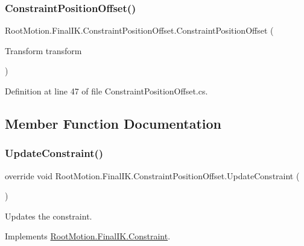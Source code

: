 \subsubsection{\texorpdfstring{Constraint\+Position\+Offset()}{ConstraintPositionOffset()}\hspace{0.1cm}{\footnotesize\ttfamily [2/2]}}
{\footnotesize\ttfamily Root\+Motion.\+Final\+I\+K.\+Constraint\+Position\+Offset.\+Constraint\+Position\+Offset (\begin{DoxyParamCaption}\item[{Transform}]{transform }\end{DoxyParamCaption})}



Definition at line 47 of file Constraint\+Position\+Offset.\+cs.



\subsection{Member Function Documentation}
\mbox{\label{class_root_motion_1_1_final_i_k_1_1_constraint_position_offset_a0b9bf29de200b4f52e88dd817e989ceb}} 
\subsubsection{\texorpdfstring{Update\+Constraint()}{UpdateConstraint()}}
{\footnotesize\ttfamily override void Root\+Motion.\+Final\+I\+K.\+Constraint\+Position\+Offset.\+Update\+Constraint (\begin{DoxyParamCaption}{ }\end{DoxyParamCaption})\hspace{0.3cm}{\ttfamily [virtual]}}



Updates the constraint. 



Implements \mbox{\hyperlink{class_root_motion_1_1_final_i_k_1_1_constraint_a3abc634189f065586d8d57c653c22fdd}{Root\+Motion.\+Final\+I\+K.\+Constraint}}.




